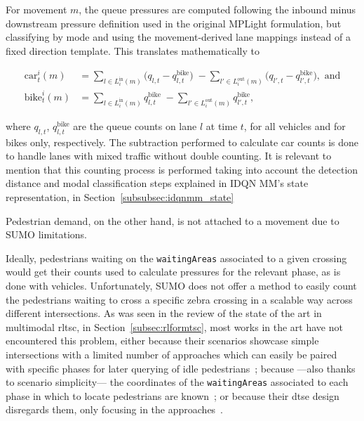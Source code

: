 For movement $m$, the queue pressures are computed following the inbound minus downstream pressure definition used in the original MPLight formulation, but classifying by mode and using the movement-derived lane mappings instead of a fixed direction template. This translates mathematically to
 
\begin{align}
\mathrm{car}_t^i(m) &= \sum_{l \in L_i^{\mathrm{in}}(m)} \big(q_{l,t} - q_{l,t}^{\mathrm{bike}}\big) \;- \sum_{l' \in L_i^{\mathrm{out}}(m)} \big(q_{l',t} - q_{l',t}^{\mathrm{bike}}\big), \text{ and}\\
\mathrm{bike}_t^i(m) &= \sum_{l \in L_i^{\mathrm{in}}(m)} q_{l,t}^{\mathrm{bike}} \;- \sum_{l' \in L_i^{\mathrm{out}}(m)} q_{l',t}^{\mathrm{bike}},
\end{align}
 
\noindent where $q_{l,t}$, $q_{l,t}^{\mathrm{bike}}$ are the queue counts on lane $l$ at time $t$, for all vehicles and for bikes only, respectively. The subtraction performed to calculate car counts is done to handle lanes with mixed traffic without double counting. It is relevant to mention that this counting process is performed taking into account the detection distance and modal classification steps explained in IDQN MM's state representation, in Section~\ref{subsubsec:idqnmm_state}

\medskip 

\noindent Pedestrian demand, on the other hand, is not attached to a movement due to SUMO limitations.

Ideally, pedestrians waiting on the \texttt{waitingAreas} associated to a given crossing would get their counts used to calculate pressures for the relevant phase, as is done with vehicles. Unfortunately, SUMO does not offer a method to easily count the pedestrians waiting to cross a specific zebra crossing in a scalable way across different intersections. As was seen in the review of the state of the art in multimodal \gls{rltsc}, in Section~\ref{subsec:rlformtsc}, most works in the art have not encountered this problem, either because their scenarios showcase simple intersections with a limited number of approaches which can easily be paired with specific phases for later querying of idle pedestrians~\cite{Liu2017, Zhu2022, Chen2025}; because —also thanks to scenario simplicity— the coordinates of the \texttt{waitingAreas} associated to each phase in which to locate pedestrians are known~\cite{Zhang2021c, Wang2025, Nayeri2025, Zeng2025}; or because their \gls{dtse} design disregards them, only focusing in the approaches~\cite{Han2022, Rong2024, Huang2025, Poudel2025, Zhang2025b}.

